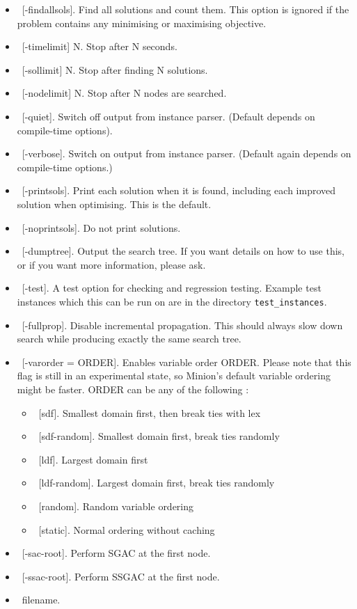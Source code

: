 \documentclass{article}
\begin{document}
\begin{small}
\begin{itemize}
\item\ [-findallsols].   Find all solutions and count them.   This option is ignored if the problem contains any minimising or maximising objective.
\item\ [-timelimit] N. Stop after N seconds.
\item\ [-sollimit] N. Stop after finding N solutions.
\item\ [-nodelimit] N. Stop after N nodes are searched.
\item\ [-quiet]. Switch off output from instance parser.  (Default depends on compile-time options).
\item\ [-verbose]. Switch on output from instance parser.  (Default again depends on compile-time options.)
\item\ [-printsols].   Print each solution when it is found, including each improved solution when optimising.  This is the default.
\item\ [-noprintsols].   Do not print solutions.
\item\ [-dumptree]. Output the search tree. If you want details on how to use this, or if you want more information, please ask.
\item\ [-test].  A test option for checking and regression testing.   Example test instances which this can be run on are in the directory {\tt test\_instances}.   
\item\ [-fullprop]. Disable incremental propagation. This should always slow down search while producing exactly the same search tree.
\item\  [-varorder = ORDER]. Enables variable order ORDER. Please note that this flag is still in an experimental state, so 
        { \sc Minion}'s default variable ordering might be faster. ORDER can be any of the following : 
      \begin{itemize}
	\item\ [sdf].  Smallest domain first, then break ties with lex 
	\item\ [sdf-random]. Smallest domain first, break ties randomly
        \item\ [ldf]. Largest domain first
        \item\ [ldf-random]. Largest domain first, break ties randomly
	\item\ [random]. Random variable ordering
	\item\ [static]. Normal ordering without caching 
      \end{itemize}
\item\ [-sac-root]. Perform SGAC at the first node. 
\item\ [-ssac-root]. Perform SSGAC at the first node. 
\item\ filename.
\end{itemize}


\end{small}
\end{document}
